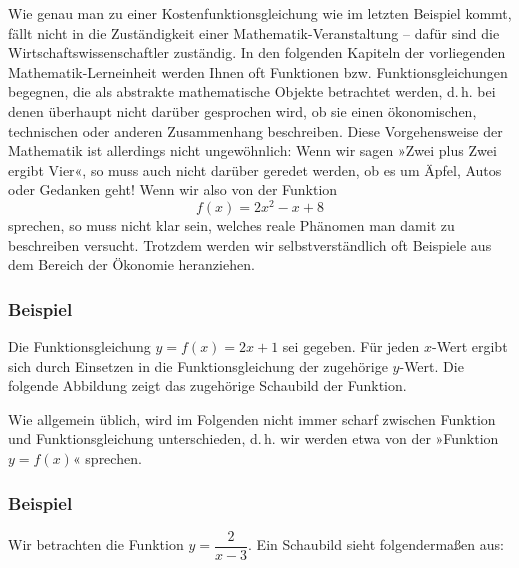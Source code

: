 Wie genau man zu einer Kostenfunktionsgleichung wie im letzten Beispiel kommt, fällt nicht in die Zuständigkeit einer Mathematik-Veranstaltung -- dafür sind die Wirtschaftswissenschaftler zuständig. In den folgenden Kapiteln der vorliegenden Mathematik-Lerneinheit werden Ihnen oft Funktionen bzw. Funktionsgleichungen begegnen, die als abstrakte mathematische Objekte betrachtet werden, d.\,h. bei denen überhaupt nicht darüber gesprochen wird, ob sie einen ökonomischen, technischen oder anderen Zusammenhang beschreiben. Diese Vorgehensweise der Mathematik ist allerdings nicht ungewöhnlich: Wenn wir sagen »Zwei plus Zwei ergibt Vier«, so muss auch nicht darüber geredet werden, ob es um Äpfel, Autos oder Gedanken geht! Wenn wir also von der Funktion
\[ f(x) = 2x^2 - x + 8 \]
sprechen, so muss nicht klar sein, welches reale Phänomen man damit zu beschreiben versucht. Trotzdem werden wir selbstverständlich oft Beispiele aus dem Bereich der Ökonomie heranziehen.

\subsubsection{Beispiel}

Die Funktionsgleichung $y = f(x) = 2x + 1$ sei gegeben. Für jeden $x$-Wert ergibt sich durch Einsetzen in die Funktionsgleichung der zugehörige $y$-Wert. Die folgende Abbildung zeigt das zugehörige Schaubild der Funktion.

\begin{center}
\end{center}

Wie allgemein üblich, wird im Folgenden nicht immer scharf zwischen Funktion und Funktionsgleichung unterschieden, d.\,h. wir werden etwa von der »Funktion $y = f(x)$« sprechen.\beispielende

\subsubsection{Beispiel}

Wir betrachten die Funktion $y = \dfrac{2}{x - 3}$. Ein Schaubild sieht folgendermaßen aus:


